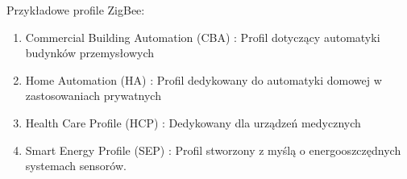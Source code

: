 Przykładowe profile ZigBee:
\begin{enumerate}
	\item Commercial Building Automation (CBA) : Profil dotyczący automatyki budynków przemysłowych
	\item Home Automation (HA) : Profil dedykowany do automatyki domowej w zastosowaniach prywatnych
	\item Health Care Profile (HCP) : Dedykowany dla urządzeń medycznych
 	\item Smart Energy Profile (SEP) : Profil stworzony z myślą o energooszczędnych systemach sensorów.
\end{enumerate} 

\clearpage